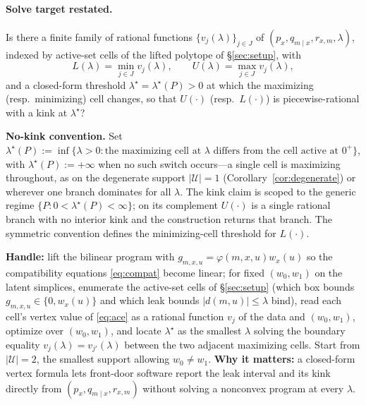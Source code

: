 \paragraph{Solve target restated.}
Is there a finite family of rational functions $\{v_j(\lambda)\}_{j\in J}$ of $(p_x,q_{m\mid x},r_{x,m},\lambda)$,
indexed by active-set cells of the lifted polytope of \S\ref{sec:setup}, with
\[
  L(\lambda)=\min_{j\in J}v_j(\lambda),\qquad U(\lambda)=\max_{j\in J}v_j(\lambda),
\]
and a closed-form threshold $\lambda^\star=\lambda^\star(P)>0$ at which the maximizing (resp.\ minimizing)
cell changes, so that $U(\cdot)$ (resp.\ $L(\cdot)$) is piecewise-rational with a kink at $\lambda^\star$?

\smallskip\noindent\textbf{No-kink convention.} Set
$\lambda^\star(P):=\inf\{\lambda>0:\text{the maximizing cell at }\lambda\text{ differs from the cell active at }0^+\}$,
with $\lambda^\star(P):=+\infty$ when no such switch occurs---a single cell is maximizing throughout, as on the
degenerate support $|\mathcal U|=1$ (Corollary~\ref{cor:degenerate}) or wherever one branch dominates for all
$\lambda$. The kink claim is scoped to the generic regime $\{P:0<\lambda^\star(P)<\infty\}$; on its complement
$U(\cdot)$ is a single rational branch with no interior kink and the construction returns that branch. The
symmetric convention defines the minimizing-cell threshold for $L(\cdot)$.

\smallskip\noindent\textbf{Handle:} lift the bilinear program with $g_{m,x,u}=\varphi(m,x,u)w_x(u)$ so the
compatibility equations \eqref{eq:compat} become linear; for fixed $(w_0,w_1)$ on the latent simplices,
enumerate the active-set cells of \S\ref{sec:setup} (which box bounds $g_{m,x,u}\in\{0,w_x(u)\}$ and which
leak bounds $|d(m,u)|\le\lambda$ bind), read each cell's vertex value of \eqref{eq:ace} as a rational
function $v_j$ of the data and $(w_0,w_1)$, optimize over $(w_0,w_1)$, and locate $\lambda^\star$ as the
smallest $\lambda$ solving the boundary equality $v_{j}(\lambda)=v_{j'}(\lambda)$ between the two adjacent
maximizing cells. Start from $|\mathcal U|=2$, the smallest support allowing $w_0\neq w_1$.
\textbf{Why it matters:} a closed-form vertex formula lets front-door software report the leak interval and
its kink directly from $(p_x,q_{m\mid x},r_{x,m})$ without solving a nonconvex program at every $\lambda$.

